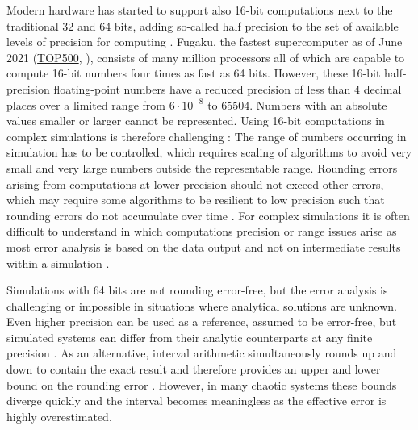 Modern hardware has started to support also 16-bit computations next to the traditional 32 and 64 bits,
adding so-called half precision to the set of available levels of precision for computing \citep{Jouppi2018,Odajima2020}.
Fugaku, the fastest supercomputer as of June 2021 (\href{https://top500.org}{TOP500}, \cite{Dongarra2011}), consists
of many million processors all of which are capable to compute 16-bit numbers four times as fast as 64 bits. However, these 
16-bit half-precision floating-point numbers have a reduced precision of less than 4 decimal places over a limited range from
$6 \cdot 10^{-8}$ to $65504$. Numbers with an absolute values smaller or larger cannot be represented. Using 16-bit computations in 
complex simulations is therefore challenging \citep{Klower2020a}: The range of numbers occurring in simulation has to be controlled,
which requires scaling of algorithms to avoid very small and very large numbers outside the representable range.
Rounding errors arising from computations at lower precision should not exceed other errors, which may require
some algorithms to be resilient to low precision such that rounding errors do not accumulate over time \citep{Higham2002}.
For complex simulations it is often difficult to understand in which computations precision or range issues arise
as most error analysis is based on the data output and not on intermediate results within a simulation \citep{Fevotte2019,Jezequel2008}.

Simulations with 64 bits are not rounding error-free, but the error analysis is challenging or impossible in
situations where analytical solutions are unknown. Even higher precision can be used as a reference, assumed to be
error-free, but simulated systems can differ from their analytic counterparts at any finite precision \citep{Boghosian2019}.
As an alternative, interval arithmetic simultaneously rounds up and down to contain the exact result and therefore provides
an upper and lower bound on the rounding error \citep{Gustafson2015}. However, in many chaotic systems these bounds
diverge quickly and the interval becomes meaningless as the effective error is highly overestimated.

